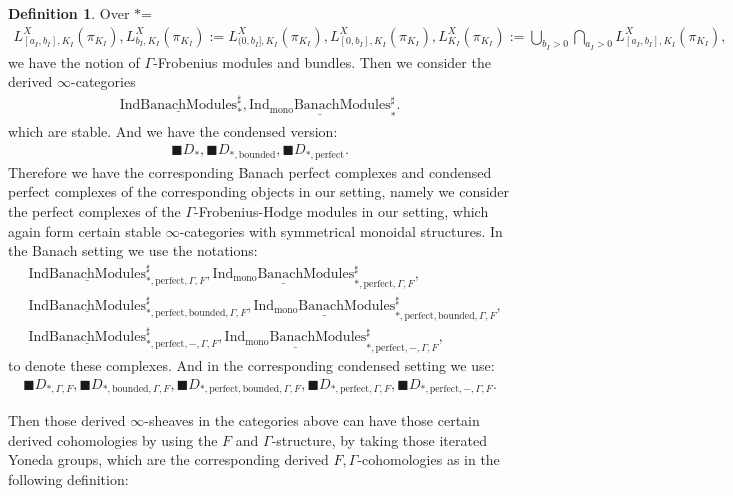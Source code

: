 \documentclass[12pt]{article}
\theoremstyle{definition}
\newtheorem{definition}{Definition}
\begin{document}
\begin{definition}
Over $*$=
\begin{align}
L^X_{[a_I,b_I],K_I}(\pi_{K_I}),L^X_{b_I,K_I}(\pi_{K_I}):=L^X_{(0,b_I],K_I}(\pi_{K_I}),L^X_{[0,b_I],K_I}(\pi_{K_I}),L^X_{K_I}(\pi_{K_I}):=\bigcup_{b_I>0}\bigcap_{a_I>0}L^X_{[a_I,b_I],K_I}(\pi_{K_I}),
\end{align} 
we have the notion of $\Gamma$-Frobenius modules and bundles. Then we consider the derived $\infty$-categories 
\begin{align}
\underline{\mathrm{IndBanachModules}}^\sharp_*, \underline{\mathrm{Ind_{\mathrm{mono}}BanachModules}}^\sharp_*.
\end{align}
which are stable. And we have the condensed version:
\begin{align}
\blacksquare D_{*}, \blacksquare D_{*,\mathrm{bounded}},\blacksquare D_{*,\mathrm{perfect}}.
\end{align}
Therefore we have the corresponding Banach perfect complexes and condensed perfect complexes of the corresponding objects in our setting, namely we consider the perfect complexes of the $\Gamma$-Frobenius-Hodge modules in our setting, which again form certain stable $\infty$-categories with symmetrical monoidal structures. In the Banach setting we use the notations:
\begin{align}
&\underline{\mathrm{IndBanachModules}}^\sharp_{*,\mathrm{perfect},\Gamma,F}, \underline{\mathrm{Ind_{\mathrm{mono}}BanachModules}}^\sharp_{*,\mathrm{perfect},\Gamma,F},\\
&\underline{\mathrm{IndBanachModules}}^\sharp_{*,\mathrm{perfect},\mathrm{bounded},\Gamma,F}, \underline{\mathrm{Ind_{\mathrm{mono}}BanachModules}}^\sharp_{*,\mathrm{perfect},\mathrm{bounded},\Gamma,F},\\
&\underline{\mathrm{IndBanachModules}}^\sharp_{*,\mathrm{perfect},-,\Gamma,F}, \underline{\mathrm{Ind_{\mathrm{mono}}BanachModules}}^\sharp_{*,\mathrm{perfect},-,\Gamma,F},
\end{align}
to denote these complexes. And in the corresponding condensed setting we use:
\begin{align}
\blacksquare D_{*,\Gamma,F}, \blacksquare D_{*,\mathrm{bounded},\Gamma,F},\blacksquare D_{*,\mathrm{perfect},\mathrm{bounded},\Gamma,F},\blacksquare D_{*,\mathrm{perfect},\Gamma,F},\blacksquare D_{*,\mathrm{perfect},-,\Gamma,F}.
\end{align}
\end{definition}

\indent Then those derived $\infty$-sheaves in the categories above can have those certain derived cohomologies by using the $F$ and $\Gamma$-structure, by taking those iterated Yoneda groups, which are the corresponding derived $F,\Gamma$-cohomologies as in the following definition:
\end{document}
